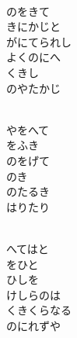 \documentclass[10pt,b5j]{tarticle} %
\begin{document}
\begin{enumerate}
\begin{minipage}[c]{\blocksize}
    \end{minipage}
    \begin{minipage}[c]{\blocksize}
        
        \vspace{\linespace}
        \item~\\
        のをきて\\
        きにかじと\\
        がにてられし\\
        よくのにへ\\
        くきし\\
        のやたかじ
        
    \end{minipage}
    \begin{minipage}[c]{\blocksize}
        
        \vspace{\linespace}
        \item~\\
        やをへて\\
        をふき\\
        のをげて\\
        のき\\
        のたるき\\
        はりたり
        
    \end{minipage}
    \begin{minipage}[c]{\blocksize}
        
        \vspace{\linespace}
        \item~\\
        へてはと\\
        をひと\\
        ひしを\\
        けしらのは\\
        くきくらなる\\
        のにれずや
        

\end{minipage}
\end{enumerate}
\end{document}
